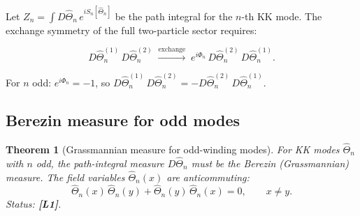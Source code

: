 \documentclass[11pt,a4paper]{article}
\newtheorem{theorem}{Theorem}
\newcommand{\Lone}{\textbf{[L1]}}
\begin{document}
Let $Z_n = \int D\hat\Theta_n\,e^{iS_n[\hat\Theta_n]}$ be the path integral
for the $n$-th KK mode.  The exchange symmetry of the full two-particle sector
requires:

\begin{equation}
\label{eq:pi_exchange}
  D\hat\Theta_n^{(1)}\,D\hat\Theta_n^{(2)}
  \;\xrightarrow{\text{exchange}}\;
  e^{i\Phi_n}\,
  D\hat\Theta_n^{(2)}\,D\hat\Theta_n^{(1)}.
\end{equation}

For $n$ odd: $e^{i\Phi_n} = -1$, so
$D\hat\Theta_n^{(1)}\,D\hat\Theta_n^{(2)} = -D\hat\Theta_n^{(2)}\,D\hat\Theta_n^{(1)}$.

\subsection{Berezin measure for odd modes}

\begin{theorem}[Grassmannian measure for odd-winding modes]
\label{thm:grassmann}
  For KK modes $\hat\Theta_n$ with $n$ odd, the path-integral measure
  $D\hat\Theta_n$ must be the Berezin (Grassmannian) measure.
  The field variables $\hat\Theta_n(x)$ are anticommuting:
  \begin{equation}
  \label{eq:anticommute}
    \hat\Theta_n(x)\,\hat\Theta_n(y)
    + \hat\Theta_n(y)\,\hat\Theta_n(x) = 0,
    \qquad x\neq y.
  \end{equation}
  Status: \Lone{}.
\end{theorem}
\end{document}
